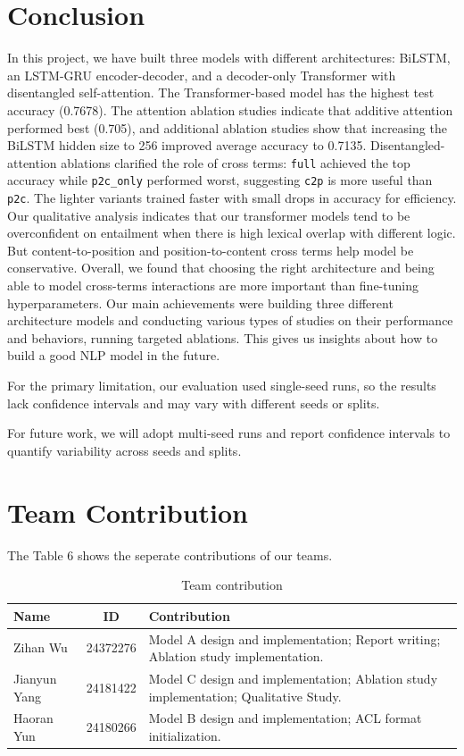\documentclass[11pt]{article}
\begin{document}
\FloatBarrier

\section{Conclusion}
In this project, we have built three models with different architectures: BiLSTM, an LSTM-GRU encoder-decoder, and a decoder-only Transformer with disentangled self-attention. The Transformer-based model has the highest test accuracy (0.7678). The attention ablation studies indicate that additive attention performed best (0.705), and additional ablation studies show that increasing the BiLSTM hidden size to 256 improved average accuracy to 0.7135. Disentangled-attention ablations clarified the role of cross terms: \texttt{full} achieved the top accuracy while \texttt{p2c\_only} performed worst, suggesting \texttt{c2p} is more useful than \texttt{p2c}. The lighter variants trained faster with small drops in accuracy for efficiency. Our qualitative analysis indicates that our transformer models tend to be overconfident on entailment when there is high lexical overlap with different logic. But content-to-position and position-to-content cross terms help model be conservative. Overall, we found that choosing the right architecture and being able to model cross-terms interactions are more important than fine-tuning hyperparameters. Our main achievements were building three different architecture models and conducting various types of studies on their performance and behaviors, running targeted ablations. This gives us insights about how to build a good NLP model in the future.

For the primary limitation, our evaluation used single-seed runs, so the results lack confidence intervals and may vary with different seeds or splits.

For future work, we will adopt multi-seed runs and report confidence intervals to quantify variability across seeds and splits.


\section{Team Contribution}
The Table 6 shows the seperate contributions of our teams.
\begin{table}[htbp]
  \centering
  \begin{tabularx}{\linewidth}{l c X} 
    \hline
    \textbf{Name} & \textbf{ID} & \textbf{Contribution} \\
    \hline
    Zihan Wu & 24372276 & Model A design and implementation; Report writing; Ablation study implementation. \\
    Jianyun Yang & 24181422 & Model C design and implementation; Ablation study implementation; Qualitative Study. \\
    Haoran Yun & 24180266 & Model B design and implementation; ACL format initialization. \\
    \hline
  \end{tabularx}
  \caption{Team contribution}
  \label{tab:dataset_stats}
\end{table}
\end{document}
